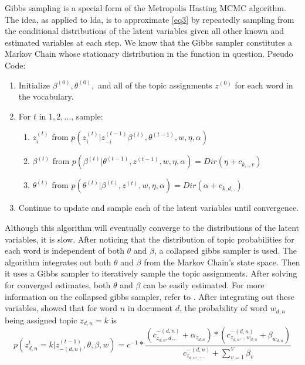 \documentclass[3p,times]{elsarticle}
\begin{document}
\noindent Gibbs sampling is a special form of the Metropolis Hasting MCMC algorithm. The idea, as applied to lda, is to approximate \ref{eq3} by repeatedly sampling from the conditional distributions of the latent variables given all other known and estimated variables at each step. We know that the Gibbs sampler constitutes a Markov Chain whose stationary distribution in the function in question. Pseudo Code:
\begin{enumerate}
	\item Initialize $\beta^{(0)}, \theta^{(0)},$ and all of the topic assignments $z^{(0)}$ for each word in the vocabulary.
	\item For $t$ in $1,2,...$, sample:
	\begin{enumerate}
		\item $z^{(t)}_{i}$ from $p(z_{i}^{(t)} | z^{(t-1)}_{-i} \beta^{(t)}, \theta^{(t-1)}, w, \eta, \alpha)$
		\item $\beta^{(t)}$ from $p(\beta^{(t)} | \theta^{(t-1)}, z^{(t-1)}, w, \eta, \alpha)=Dir(\eta+c_{k,.,v})$
		\item $\theta^{(t)}$ from $p(\theta^{(t)} | \beta^{(t)}, z^{(t)}, w, \eta, \alpha)=Dir(\alpha+c_{k,d,.})$
	\end{enumerate}
	\item Continue to update and sample each of the latent variables until convergence.
\end{enumerate}


\noindent Although this algorithm will eventually converge to the distributions of the latent variables, it is slow. After noticing that the distribution of topic probabilities for each word is independent of both $\theta$ and $\beta$, a collapsed gibbs sampler is used. The algorithm integrates out both $\theta$ and $\beta$ from the Markov Chain's state space. Then it uses a Gibbs sampler to iteratively sample the topic assignments. After solving for converged estimates, both $\theta$ and $\beta$ can be easily estimated. For more information on the collapsed gibbs sampler, refer to \cite{CGSTheory}. After integrating out these variables, \cite{multinom} showed that for word $n$ in document $d$, the probability of word $w_{d,n}$ being assigned topic $z_{d,n}=k$ is 
\begin{equation} \label{eq4}
p( z^{t}_{d,n}=k| z^{(t-1)}_{-(d,n)}, \theta, \beta, w) =c^{-1}*\frac{(c^{-(d,n)}_{z_{d,n},d,.}+\alpha_{z_{d,n}})*(c^{-(d,n)}_{z_{d,n},.,w_{d,n}}+\beta_{w_{d,n}})}{c^{-(d,n)}_{z_{d,n},.,.}+\sum_{v=1}^{V}{\beta_{v}}} 
\end{equation}
\end{document}
